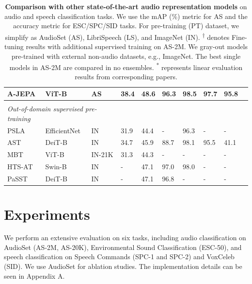 \documentclass{article}
\begin{document}
\begin{table}[t!]
\begin{center}
{\begin{tabular}{llllllllll}
A-JEPA & ViT-B & AS &\textbf{38.4} &\textbf{48.6} &\textbf{96.3} &\textbf{98.5} &\textbf{97.7} &\textbf{95.8}\\
\hline & \\[-2ex]
\multicolumn{3}{l}{\emph{Out-of-domain supervised pre-training}}& \multicolumn{5}{l}{} \\
\color{gray}PSLA~\cite{gong2021psla} & \color{gray}EfficientNet & \color{gray}IN & \color{gray}31.9 & \color{gray}44.4 & - & \color{gray}96.3 & - & \color{gray}- \\
\color{gray}AST~\cite{gong2021ast} & \color{gray}DeiT-B & \color{gray}IN &   \color{gray}34.7 & \color{gray}45.9 & \color{gray}88.7 & \color{gray}98.1 & \color{gray}95.5 & \color{gray}41.1 \\ 
\color{gray}MBT~\cite{Nagrani21c} & \color{gray}ViT-B & \color{gray}IN-21K &  \color{gray}31.3 & \color{gray}44.3 & - & - & - & - \\
\color{gray}HTS-AT~\cite{chen2022hts} & \color{gray}Swin-B & \color{gray}IN & - & \color{gray}47.1 & \color{gray}97.0& \color{gray}98.0 & - & - \\
\color{gray}PaSST~\cite{paast} & \color{gray}DeiT-B & \color{gray}IN & - & \color{gray}47.1 & \color{gray}96.8 & - & - & - \\
\end{tabular}}
\caption{
\textbf{Comparison with other state-of-the-art audio representation models} on audio and speech classification tasks. 
We use the mAP (\%) metric for AS and the accuracy metric for ESC/SPC/SID tasks. 
For pre-training (PT) dataset, we simplify as AudioSet (AS), LibriSpeech (LS), and ImageNet (IN). 
\textsuperscript{$\dagger$} denotes Fine-tuning results with additional supervised training on AS-2M. 
We {\color{gray}gray-out} models pre-trained with external non-audio datasets, e.g., ImageNet.
The best single models in AS-2M are compared in no ensembles. \textsuperscript{*} represents linear evaluation results from corresponding papers. %
}
\label{tab:sota}
\end{center}
\end{table}



\section{Experiments}

We perform an extensive evaluation on six tasks, including audio classification on AudioSet (AS-2M, AS-20K), Environmental Sound Classification (ESC-50), and speech classification on Speech Commands (SPC-1 and SPC-2) and VoxCeleb (SID). We use AudioSet for ablation studies. The implementation details can be seen in Appendix A. 
\end{document}
